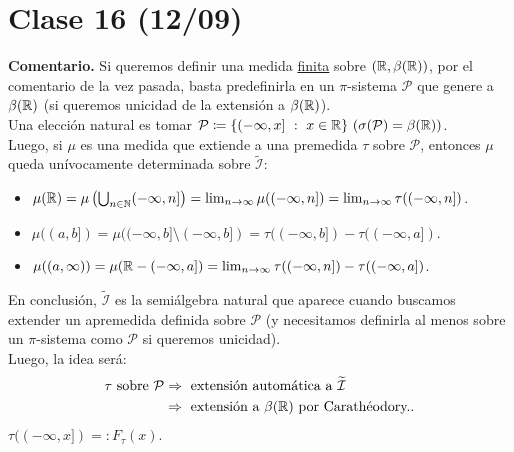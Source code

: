 \section{Clase 16 (12/09)}

\textbf{Comentario.} Si queremos definir una medida \underline{finita} sobre $(\mathbb{R},\beta(\mathbb{R}))$, por el comentario de la vez pasada, basta predefinirla en un $\pi$-sistema $\mathcal{P}$ que genere a $\beta(\mathbb{R})$ (si queremos unicidad de la extensión a $\beta(\mathbb{R})$). \\

\noindent Una elección natural es tomar $\mathcal{P} \coloneq \{ (-\infty,x] \ : \ x \in \mathbb{R} \} \ (\sigma(\mathcal{P}) = \beta(\mathbb{R}))$. \\

\noindent Luego, si $\mu$ es una medida que extiende a una premedida $\tau$ sobre $\mathcal{P}$, entonces $\mu$ queda unívocamente determinada sobre $\widetilde{\mathcal{I}}$:

\begin{itemize}
	\item $\mu(\mathbb{R}) = \mu\left( \bigcup_{n\in\mathbb{N}} (-\infty,n] \right) = \lim_{n \to \infty} \mu((-\infty,n]) = \lim_{n \to \infty} \tau((-\infty,n])$.

	\item $\mu((a,b]) = \mu((-\infty,b] \setminus (-\infty,b]) = \tau((-\infty,b]) - \tau((-\infty,a])$.

	\item $\mu((a,\infty)) = \mu(\mathbb{R}-(-\infty,a]) = \lim_{n \to \infty} \tau((-\infty,n]) - \tau((-\infty,a])$.
\end{itemize}

\noindent En conclusión, $\widetilde{\mathcal{I}}$ es la semiálgebra natural que aparece cuando buscamos extender un apremedida definida sobre $\mathcal{P}$ (y necesitamos definirla al menos sobre un $\pi$-sistema como $\mathcal{P}$ si queremos unicidad). \\

\noindent Luego, la idea será:
\begin{align*}
	\tau \text{ sobre } \mathcal{P} &\Rightarrow \text{ extensión automática a } \widetilde{\mathcal{I}} \\
	&\Rightarrow \text{ extensión a } \beta(\mathbb{R}) \text{ por Carathéodory.}
.\end{align*}
$\tau((-\infty,x]) =: F_{\tau}(x)$.

